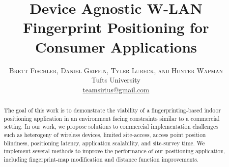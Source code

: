 \documentclass[twoside]{article}
\title{\vspace{-15mm}\fontsize{24pt}{10pt}\selectfont\textbf{Device Agnostic W-LAN Fingerprint Positioning for Consumer Applications}} %
\author{
\large
\textsc{Brett Fischler, Daniel Griffin, Tyler Lubeck, and Hunter Wapman}\\
\normalsize Tufts University\\ %
\normalsize \href{mailto:teamsirius@gmail.com}{teamsirius@gmail.com} %
\vspace{-5mm}
}
\date{}
\begin{document}
\maketitle %

\thispagestyle{fancy} %


\begin{abstract}

\noindent 
The goal of this work is to demonstrate the viability of a fingerprinting-based indoor positioning application in an environment facing constraints similar to a commercial setting. In our work, we propose solutions to commercial implementation challenges such as heterogeny of wireless devices, limited site-access, access point position blindness, positioning latency, application scalability, and site-survey time. We implement several methods to improve the performance of our positioning application, including fingerprint-map modification and distance function improvements.

\end{abstract}

\end{document}
